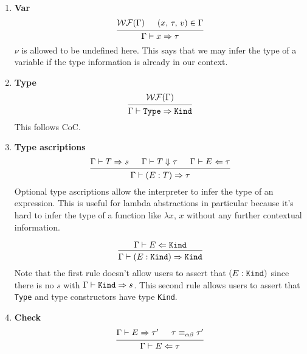 \documentclass{article}
\begin{document}
\begin{enumerate}
\item \textbf{Var} \\
  \[
    \begin{prooftree}
      \hypo{\wf(\Gamma)}
      \hypo{(x, \, \tau, \, v) \in \Gamma}
      \infer2{\Gamma \vdash x \Rightarrow \tau}
    \end{prooftree}
  \]
  $\nu$ is allowed to be undefined here.
  This says that we may infer the type of a variable if the type information
  is already in our context.

\item \textbf{Type} \\
  \[
    \begin{prooftree}
      \hypo{\wf(\Gamma)}
      \infer1{\Gamma \vdash \Type \Rightarrow \Kind}
    \end{prooftree}
  \]
  This follows CoC.


\item \textbf{Type ascriptions} \\
  \[
    \begin{prooftree}
      \hypo{\Gamma \vdash T \Rightarrow s}
      \hypo{\Gamma \vdash T \Downarrow \tau}
      \hypo{\Gamma \vdash E \Leftarrow \tau}
      \infer3{\Gamma \vdash (E : T) \Rightarrow \tau}
    \end{prooftree}
  \]
  Optional type ascriptions allow the interpreter to infer the type of an
  expression. This is useful for lambda abstractions in particular because it's
  hard to infer the type of a function like $\lambda x, \, x$ without any
  further contextual information.

  \[
    \begin{prooftree}
      \hypo{\Gamma \vdash E \Leftarrow \Kind}
      \infer1{\Gamma \vdash (E : \Kind) \Rightarrow \Kind}
    \end{prooftree}
  \]
  Note that the first rule doesn't allow users to assert that $(E : \texttt{Kind})$
  since there is no $s$ with $\Gamma \vdash \texttt{Kind} \Rightarrow s$.
  This second rule allows users to assert that \verb|Type| and type constructors
  have type \verb|Kind|.

\item \textbf{Check} \\
  \[
    \begin{prooftree}
      \hypo{\Gamma \vdash E \Rightarrow \tau'}
      \hypo{\tau \equiv_{\alpha \beta} \tau'}
      \infer2{\Gamma \vdash E \Leftarrow \tau}
    \end{prooftree}
  \]


\end{enumerate}
\end{document}
